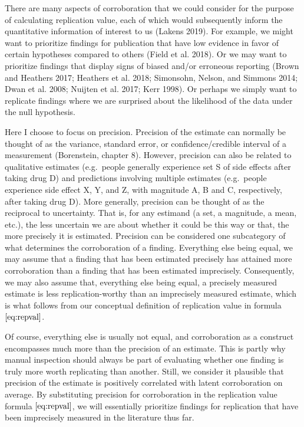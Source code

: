\documentclass[]{article}
\begin{document}
There are many aspects of corroboration that we could consider for the
purpose of calculating replication value, each of which would
subsequently inform the quantitative information of interest to us
(Lakens 2019). For example, we might want to prioritize findings for
publication that have low evidence in favor of certain hypotheses
compared to others (Field et al. 2018). Or we may want to prioritize
findings that display signs of biased and/or erroneous reporting (Brown
and Heathers 2017; Heathers et al. 2018; Simonsohn, Nelson, and Simmons
2014; Dwan et al. 2008; Nuijten et al. 2017; Kerr 1998). Or perhaps we
simply want to replicate findings where we are surprised about the
likelihood of the data under the null hypothesis.

Here I choose to focus on precision. Precision of the estimate can
normally be thought of as the variance, standard error, or
confidence/credible interval of a measurement (Borenstein, chapter 8).
However, precision can also be related to qualitative estimates
(e.g.~people generally experience set S of side effects after taking
drug D) and predictions involving multiple estimates (e.g.~people
experience side effect X, Y, and Z, with magnitude A, B and C,
respectively, after taking drug D). More generally, precision can be
thought of as the reciprocal to uncertainty. That is, for any estimand
(a set, a magnitude, a mean, etc.), the less uncertain we are about
whether it could be this way or that, the more precisely it is
estimated. Precision can be considered one subcategory of what
determines the corroboration of a finding. Everything else being equal,
we may assume that a finding that has been estimated precisely has
attained more corroboration than a finding that has been estimated
imprecisely. Consequently, we may also assume that, everything else
being equal, a precisely measured estimate is less replication-worthy
than an imprecisely measured estimate, which is what follows from our
conceptual definition of replication value in formula
\(\eqref{eq:repval}\).

Of course, everything else is usually not equal, and corroboration as a
construct encompasses much more than the precision of an estimate. This
is partly why manual inspection should always be part of evaluating
whether one finding is truly more worth replicating than another. Still,
we consider it plausible that precision of the estimate is positively
correlated with latent corroboration on average. By substituting
precision for corroboration in the replication value formula
\(\eqref{eq:repval}\), we will essentially prioritize findings for
replication that have been imprecisely measured in the literature thus
far.
\end{document}
